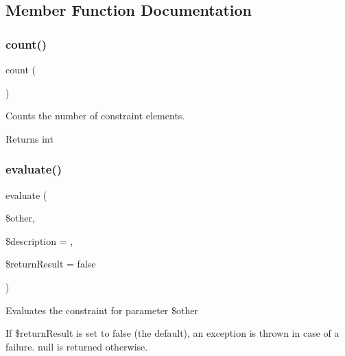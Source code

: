 \subsection{Member Function Documentation}
\mbox{\label{class_p_h_p_unit___framework___constraint___not_ac751e87b3d4c4bf2feb03bee8b092755}} 
\subsubsection{\texorpdfstring{count()}{count()}}
{\footnotesize\ttfamily count (\begin{DoxyParamCaption}{ }\end{DoxyParamCaption})}

Counts the number of constraint elements.

\begin{DoxyReturn}{Returns}
int 
\end{DoxyReturn}
\mbox{\label{class_p_h_p_unit___framework___constraint___not_a4c184790087f7d42c3daf0d0180fe5fb}} 
\subsubsection{\texorpdfstring{evaluate()}{evaluate()}}
{\footnotesize\ttfamily evaluate (\begin{DoxyParamCaption}\item[{}]{\$other,  }\item[{}]{\$description = {\ttfamily \textquotesingle{}\textquotesingle{}},  }\item[{}]{\$return\+Result = {\ttfamily false} }\end{DoxyParamCaption})}

Evaluates the constraint for parameter \$other

If \$return\+Result is set to false (the default), an exception is thrown in case of a failure. null is returned otherwise.

